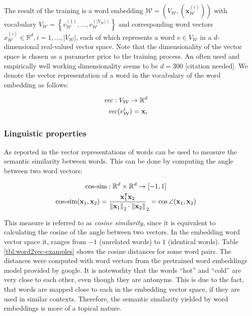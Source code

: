 The result of the training is a word embedding $\mathcal{W}=\left(V_{\mathcal{W}}, (\mathbf{x}_\mathcal{W}^{(i)})\right)$ 
with vocabulary $V_{\mathcal{W}} = \left\{ v_{\mathcal{W}}^{(1)}, \ldots,
v_\mathcal{W}^{(|V_\mathcal{W}|)} \right\} $ and corresponding word vectors
$x_\mathcal{W}^{(i)} \in \mathbb{R}^d, i=1,\ldots, |V_{\mathcal{W}}|$, each of
which represents a word $v \in V_\mathcal{W}$ in a $d$-dimensional real-valued vector space. Note that the dimensionality of the vector space is chosen as a parameter prior to the training process. An often
used and empirically well working dimensionality seems to be $d=300$ [citation
needed].
We denote the vector representation of a word in the vocabulary of the word
embedding as follows:

\begin{equation*}
\begin{split}
\mathit{vec}: V_\mathcal{W} \to \mathbb{R}^d \\
\mathit{vec}(v^i_{\mathcal{W}}) = \mathbf{x}_i
\end{split}
\end{equation*}

\subsubsection{Linguistic properties}
As reported in \cite{mikolov2013distributed} the vector representations
of words can be used to measure the semantic similarity between words. This can
be done by computing the angle between two word vectors:

\begin{gather*}
\mathit{\text{cos-sim}}: \mathbb{R}^d \times \mathbb{R}^d \to [-1, 1] \\
\mathit{\text{cos-sim}}(\mathbf{x}_1, \mathbf{x}_2) =
\frac{\mathbf{x}_1^\intercal\mathbf{x}_2}{\left\lVert\mathbf{x}_1\right\rVert_2 \cdot
\left\lVert\mathbf{x}_2\right\rVert}_2 = \cos \angle (\mathbf{x}_1, \mathbf{x}_2)
\end{gather*}

This measure is referred to as \emph{cosine similarity}, since it is
equivalent to calculating the cosine of the angle between two vectors. In the
embedding word vector space it, ranges from $-1$ (unrelated words) to $1$
(identical words). Table \ref{tbl:word2vec-examples} shows the cosine
distances for some word pairs. The distances were computed with word vectors
from the pretrained word embeddings model provided by google. It is noteworhty
that the words ``hot'' and ``cold'' are very close to each other, even though
they are antonyms. This is due to the fact, that words are mapped close to each
in the embedding vector space, if they are used in similar contexts. Therefore,
the semantic similarity yielded by word embeddings is more of a topical nature.

